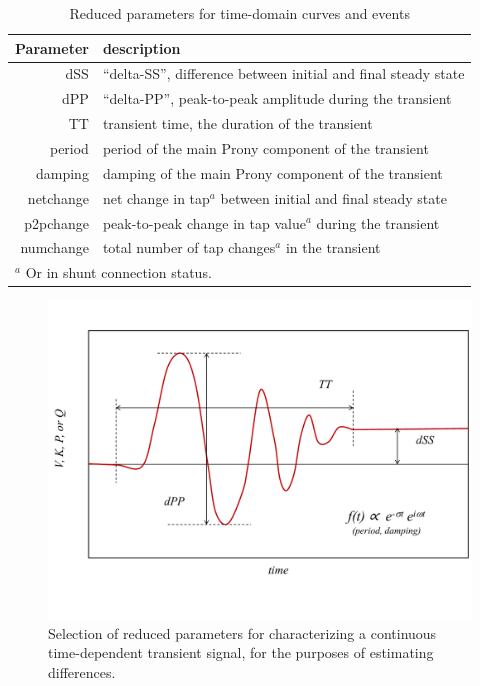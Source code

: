 \documentclass[conference]{IEEEtran}
\begin{document}
\begin{table}
  \caption{Reduced parameters for time-domain curves and events}
  \centering
  \begin{tabular}{@{}rl@{}}
    \toprule
    \textbf{Parameter} & \textbf{description}                                            \\
    \midrule
    dSS                & ``delta-SS'', difference between initial and final steady state \\
    dPP                & ``delta-PP'', peak-to-peak amplitude during the transient       \\
    TT                 & transient time, the duration of the transient                   \\
    period             & period of the main Prony component of the transient             \\
    damping            & damping of the main Prony component of the transient            \\
    netchange          & net change in tap$^a$ between initial and final steady state    \\
    p2pchange          & peak-to-peak change in tap value$^a$ during the transient       \\
    numchange          & total number of tap changes$^a$ in the transient                \\
    \bottomrule
    \multicolumn{2}{l}{$^a$ Or in shunt connection status.}
  \end{tabular}
  \label{tab:reducedparams}
\end{table}

\begin{figure}
  \centering
  \includegraphics[width=\columnwidth]{figs/transient_characteristics_1}
  \caption{Selection of reduced parameters for characterizing a
    continuous time-dependent transient signal, for the purposes of
    estimating differences.}
  \label{fig:tcharacteristics1}
\end{figure}
\end{document}
